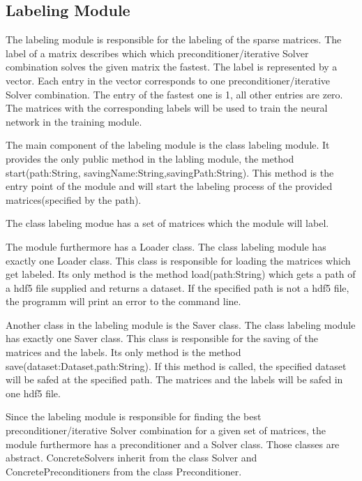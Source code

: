 \documentclass[parskip=full]{scrartcl}
\begin{document}
\subsection{Labeling Module}
The labeling module is responsible for the labeling of the sparse matrices. The label of a matrix describes which which preconditioner/iterative Solver combination solves the given matrix the fastest. The label is represented by a vector. Each entry in the vector corresponds to one preconditioner/iterative Solver combination. The entry of the fastest one is 1, all other entries are zero. The matrices with the corresponding labels will be used to train the neural network in the training module. 

The main component of the labeling module is the class labeling module. It provides the only public method in the labling module, the method start(path:String, savingName:String,savingPath:String). This method is the entry point of the module and will start the labeling process of the provided matrices(specified by the path). \newline\newline

The class labeling modue has a set of matrices which the module will label.\newline\newline

The module furthermore has a Loader class. The class labeling module has exactly one Loader class. This class is responsible for loading the matrices which get labeled. Its only method is the method load(path:String) which gets a path of a hdf5 file supplied and returns a dataset. If the specified path is not a hdf5 file, the programm will print an error to the command line. \newline\newline

Another class in the labeling module is the Saver class. The class labeling module has exactly one Saver class. This class is responsible for the saving of the matrices and the labels. Its only method is the method save(dataset:Dataset,path:String). If this method is called, the specified dataset will be safed at the specified path. The matrices and the labels will be safed in one hdf5 file.\newline
\newline

Since the labeling module is responsible for finding the best preconditioner/iterative Solver combination for a given set of matrices, the module furthermore has a preconditioner and a Solver class. Those classes are abstract. ConcreteSolvers inherit from the class Solver and ConcretePreconditioners from the class Preconditioner.\newline\newline
\end{document}
